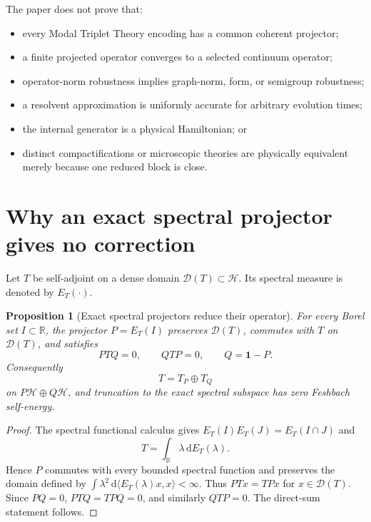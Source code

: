\documentclass[11pt]{article}
\newtheorem{proposition}[theorem]{Proposition}
\theoremstyle{definition}
\theoremstyle{remark}
\newcommand{\cD}{\mathcal D}
\newcommand{\cH}{\mathcal H}
\newcommand{\RR}{\mathbb R}
\newcommand{\1}{\mathbf 1}
\newcommand{\dd}{\mathrm d}
\newcommand{\MTT}{Modal Triplet Theory}
\begin{document}
The paper does not prove that:
\begin{itemize}[leftmargin=2em]
\item every \MTT{} encoding has a common coherent projector;
\item a finite projected operator converges to a selected continuum
      operator;
\item operator-norm robustness implies graph-norm, form, or semigroup
      robustness;
\item a resolvent approximation is uniformly accurate for arbitrary
      evolution times;
\item the internal generator is a physical Hamiltonian; or
\item distinct compactifications or microscopic theories are physically
      equivalent merely because one reduced block is close.
\end{itemize}

\section{Why an exact spectral projector gives no correction}
\label{sec:exactP}

Let \(T\) be self-adjoint on a dense domain \(\cD(T)\subset\cH\).  Its
spectral measure is denoted by \(E_T(\cdot)\).

\begin{proposition}[Exact spectral projectors reduce their operator]
\label{prop:reducing}
For every Borel set \(I\subset\RR\), the projector \(P=E_T(I)\) preserves
\(\cD(T)\), commutes with \(T\) on \(\cD(T)\), and satisfies
\[
  PTQ=0,
  \qquad
  QTP=0,
  \qquad Q=\1-P.
\]
Consequently
\[
  T=T_P\oplus T_Q
\]
on \(P\cH\oplus Q\cH\), and truncation to the exact spectral subspace has
zero Feshbach self-energy.
\end{proposition}

\begin{proof}
The spectral functional calculus gives
\(E_T(I)E_T(J)=E_T(I\cap J)\) and
\[
  T=\int_{\RR}\lambda\,\dd E_T(\lambda).
\]
Hence \(P\) commutes with every bounded spectral function and preserves
the domain defined by
\(\int\lambda^2\,\dd\langle E_T(\lambda)x,x\rangle<\infty\).
Thus \(PTx=TPx\) for \(x\in\cD(T)\).  Since \(PQ=0\),
\(PTQ=TPQ=0\), and similarly \(QTP=0\).  The direct-sum statement
follows.
\end{proof}
\end{document}
